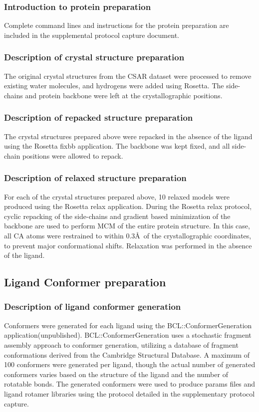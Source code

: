 \subsubsection{Introduction to protein preparation}
Complete command lines and instructions for the protein preparation are included in the supplemental protocol capture document.

\subsubsection{Description of crystal structure preparation}
The original crystal structures from the CSAR dataset were processed to remove existing water molecules, and hydrogens were added using Rosetta.
The side-chains and protein backbone were left at the crystallographic positions.

\subsubsection{Description of repacked structure preparation}
The crystal structures prepared above were repacked in the absence of the ligand using the Rosetta fixbb application.
The backbone was kept fixed, and all side-chain positions were allowed to repack\citep{Kortemme:2004ia}.

\subsubsection{Description of relaxed structure preparation}
For each of the crystal structures prepared above, 10 relaxed models were produced using the Rosetta relax application.
During the Rosetta relax protocol, cyclic repacking of the side-chains and gradient based minimization of the backbone are used to perform MCM of the entire protein structure.
In this case, all CA atoms were restrained to within 0.3\AA\ of the crystallographic coordinates, to prevent major conformational shifts.
Relaxation was performed in the absence of the ligand.

\subsection{Ligand Conformer preparation}
\subsubsection{Description of ligand conformer generation}

Conformers were generated for each ligand using the BCL::ConformerGeneration application(unpublished).
BCL::ConformerGeneration uses a stochastic fragment assembly approach to conformer generation, utilizing a database of fragment conformations derived from the Cambridge Structural Database. 
A maximum of 100 conformers were generated per ligand, though the actual number of generated conformers varies based on the structure of the ligand and the number of rotatable bonds. The generated conformers were used to produce params files and ligand rotamer libraries using the protocol detailed in the supplementary protocol capture.
